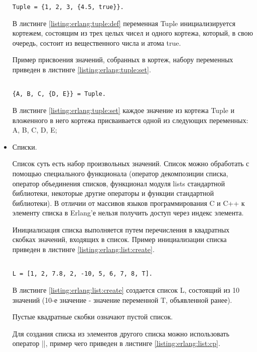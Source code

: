 \begin{itemize}
\begin{lstlisting}
Tuple = {1, 2, 3, {4.5, true}}.

\end{lstlisting}
\mylistingend

		В листинге \ref{listing:erlang:tuple:def} переменная Tuple инициализируется кортежем, состоящим из трех целых чисел и одного кортежа, который, в свою очередь, состоит из вещественного числа и атома true.

		Пример присвоения значений, собранных в кортеж, набору переменных приведен в листинге \ref{listing:erlang:tuple:set}.

\begin{lstlisting}

{A, B, C, {D, E}} = Tuple.

\end{lstlisting}
\mylistingend

		В листинге \ref{listing:erlang:tuple:set} каждое значение из кортежа Tuple и вложенного в него кортежа присваивается одной из следующих переменных: A, B, C, D, E;

	\item Списки.

		Список суть есть набор произвольных значений. Список можно обработать с помощью специального функционала (оператор декомпозиции списка, оператор объединения списков, функционал модуля lists стандартной библиотеки, некоторые другие операторы и функции стандартной библиотеки). В отличии от массивов языков программирования C и C++ к элементу списка в Erlang'е нельзя получить доступ через индекс элемента.

		Инициализация списка выполняется путем перечисления в квадратных скобках значений, входящих в список. Пример инициализации списка приведен в листинге \ref{listing:erlang:list:create}.

\begin{lstlisting}

L = [1, 2, 7.8, 2, -10, 5, 6, 7, 8, T].

\end{lstlisting}
\mylistingend

		В листинге \ref{listing:erlang:list:create} создается список L, состоящий из 10 значений (10-е значение - значение переменной T, объявленной ранее).

		Пустые квадратные скобки означают пустой список.

		Для создания списка из элементов другого списка можно использовать оператор ||, пример чего приведен в листинге \ref{listing:erlang:list:cp}.


\end{itemize}

